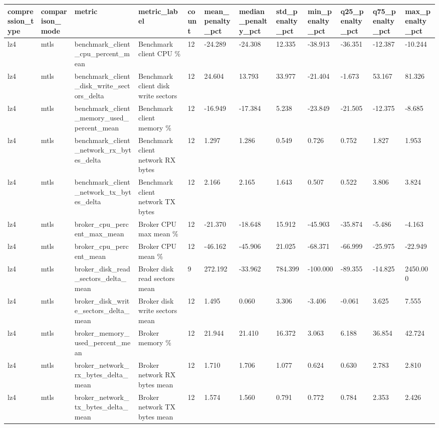 \begin{longtable}{llllllllllll}
\hline
compression\_type & comparison\_mode & metric & metric\_label & count & mean\_penalty\_pct & median\_penalty\_pct & std\_penalty\_pct & min\_penalty\_pct & q25\_penalty\_pct & q75\_penalty\_pct & max\_penalty\_pct \\
\hline
lz4 & mtls & benchmark\_client\_cpu\_percent\_mean & Benchmark client CPU \% & 12 & -24.289 & -24.308 & 12.335 & -38.913 & -36.351 & -12.387 & -10.244 \\
lz4 & mtls & benchmark\_client\_disk\_write\_sectors\_delta & Benchmark client disk write sectors & 12 & 24.604 & 13.793 & 33.977 & -21.404 & -1.673 & 53.167 & 81.326 \\
lz4 & mtls & benchmark\_client\_memory\_used\_percent\_mean & Benchmark client memory \% & 12 & -16.949 & -17.384 & 5.238 & -23.849 & -21.505 & -12.375 & -8.685 \\
lz4 & mtls & benchmark\_client\_network\_rx\_bytes\_delta & Benchmark client network RX bytes & 12 & 1.297 & 1.286 & 0.549 & 0.726 & 0.752 & 1.827 & 1.953 \\
lz4 & mtls & benchmark\_client\_network\_tx\_bytes\_delta & Benchmark client network TX bytes & 12 & 2.166 & 2.165 & 1.643 & 0.507 & 0.522 & 3.806 & 3.824 \\
lz4 & mtls & broker\_cpu\_percent\_max\_mean & Broker CPU max mean \% & 12 & -21.370 & -18.648 & 15.912 & -45.903 & -35.874 & -5.486 & -4.163 \\
lz4 & mtls & broker\_cpu\_percent\_mean & Broker CPU mean \% & 12 & -46.162 & -45.906 & 21.025 & -68.371 & -66.999 & -25.975 & -22.949 \\
lz4 & mtls & broker\_disk\_read\_sectors\_delta\_mean & Broker disk read sectors mean & 9 & 272.192 & -33.962 & 784.399 & -100.000 & -89.355 & -14.825 & 2450.000 \\
lz4 & mtls & broker\_disk\_write\_sectors\_delta\_mean & Broker disk write sectors mean & 12 & 1.495 & 0.060 & 3.306 & -3.406 & -0.061 & 3.625 & 7.555 \\
lz4 & mtls & broker\_memory\_used\_percent\_mean & Broker memory \% & 12 & 21.944 & 21.410 & 16.372 & 3.063 & 6.188 & 36.854 & 42.724 \\
lz4 & mtls & broker\_network\_rx\_bytes\_delta\_mean & Broker network RX bytes mean & 12 & 1.710 & 1.706 & 1.077 & 0.624 & 0.630 & 2.783 & 2.810 \\
lz4 & mtls & broker\_network\_tx\_bytes\_delta\_mean & Broker network TX bytes mean & 12 & 1.574 & 1.560 & 0.791 & 0.772 & 0.784 & 2.353 & 2.426 \\

\end{longtable}
